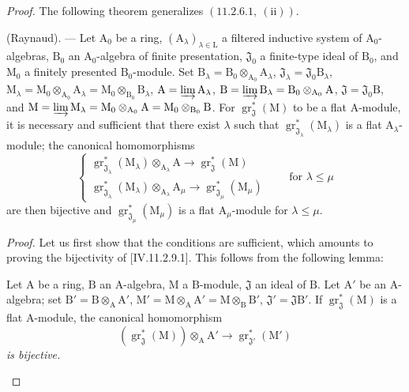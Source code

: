 \begin{proof}
The following theorem generalizes $(11.2.6.1,~(\mathrm{ii}))$.

\begin{theorem}[11.2.9]
\label{IV.11.2.9}
(Raynaud). --- Let $\mathrm{A}_0$ be a ring, $(\mathrm{A}_\lambda)_{\lambda\in\mathrm{L}}$ a filtered inductive system of $\mathrm{A}_0$-algebras, $\mathrm{B}_0$ an $\mathrm{A}_0$-algebra of finite presentation, $\mathfrak{J}_0$ a finite-type ideal of $\mathrm{B}_0$, and $\mathrm{M}_0$ a finitely presented $\mathrm{B}_0$-module. Set $\mathrm{B}_\lambda=\mathrm{B}_0\otimes_{\mathrm{A}_0}\mathrm{A}_\lambda$, $\mathfrak{J}_\lambda=\mathfrak{J}_0\mathrm{B}_\lambda$, $\mathrm{M}_\lambda=\mathrm{M}_0\otimes_{\mathrm{A}_0}\mathrm{A}_\lambda=\mathrm{M}_0\otimes_{\mathrm{B}_0}\mathrm{B}_\lambda$, $\mathrm{A}=\varinjlim\mathrm{A}_\lambda$, $\mathrm{B}=\varinjlim\mathrm{B}_\lambda=\mathrm{B}_0\otimes_{\mathrm{A}_0}\mathrm{A}$, $\mathfrak{J}=\mathfrak{J}_0\mathrm{B}$, and $\mathrm{M}=\varinjlim\mathrm{M}_\lambda=\mathrm{M}_0\otimes_{\mathrm{A}_0}\mathrm{A}=\mathrm{M}_0\otimes_{\mathrm{B}_0}\mathrm{B}$. For $\operatorname{gr}^*_\mathfrak{J}(\mathrm{M})$ to be a flat $\mathrm{A}$-module, it is necessary and sufficient that there exist $\lambda$ such that $\operatorname{gr}^*_{\mathfrak{J}_\lambda}(\mathrm{M}_\lambda)$ is a flat $\mathrm{A}_\lambda$-module; the canonical homomorphisms
\begin{equation}
  \begin{cases}
    \operatorname{gr}^*_{\mathfrak{J}_\lambda}(\mathrm{M}_\lambda)\otimes_{\mathrm{A}_\lambda}\mathrm{A} \to \operatorname{gr}^*_\mathfrak{J}(\mathrm{M}) \\
    \operatorname{gr}^*_{\mathfrak{J}_\lambda}(\mathrm{M}_\lambda)\otimes_{\mathrm{A}_\lambda}\mathrm{A}_\mu \to \operatorname{gr}^*_{\mathfrak{J}_\mu}(\mathrm{M}_\mu)
  \end{cases}
  \qquad\text{for }\lambda\leqslant\mu
  \tag{11.2.9.1}
\end{equation}
are then bijective and $\operatorname{gr}^*_{\mathfrak{J}_\mu}(\mathrm{M}_\mu)$ is a flat $\mathrm{A}_\mu$-module for $\lambda\leqslant\mu$.
\end{theorem}

\medskip
\noindent\emph{Proof.}
Let us first show that the conditions are sufficient, which amounts to proving the bijectivity of [IV.11.2.9.1]. This follows from the following lemma:

\begin{lemma}[11.2.9.2]
\label{IV.11.2.9.2}
Let $\mathrm{A}$ be a ring, $\mathrm{B}$ an $\mathrm{A}$-algebra, $\mathrm{M}$ a $\mathrm{B}$-module, $\mathfrak{J}$ an ideal of $\mathrm{B}$. Let $\mathrm{A}'$ be an $\mathrm{A}$-algebra; set $\mathrm{B}'=\mathrm{B}\otimes_\mathrm{A}\mathrm{A}'$, $\mathrm{M}'=\mathrm{M}\otimes_\mathrm{A}\mathrm{A}'=\mathrm{M}\otimes_\mathrm{B}\mathrm{B}'$, $\mathfrak{J}'=\mathfrak{J}\mathrm{B}'$. If $\operatorname{gr}^*_\mathfrak{J}(\mathrm{M})$ is a flat $\mathrm{A}$-module, the canonical homomorphism
\[
  (\operatorname{gr}^*_\mathfrak{J}(\mathrm{M}))\otimes_\mathrm{A}\mathrm{A}'\to\operatorname{gr}^*_{\mathfrak{J}'}(\mathrm{M}')
\]
\emph{is bijective.}
\end{lemma}


\end{proof}
